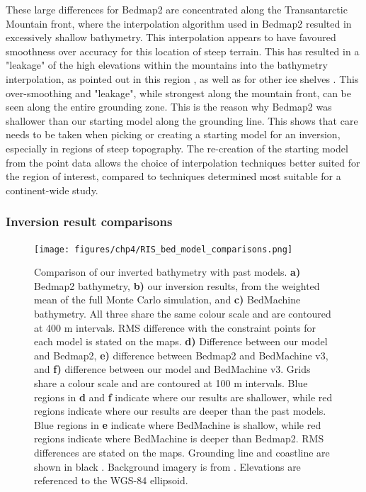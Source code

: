 These large differences for Bedmap2 are concentrated along the Transantarctic Mountain front, where the interpolation algorithm used in Bedmap2 resulted in excessively shallow bathymetry. This interpolation appears to have favoured smoothness over accuracy for this location of steep terrain. This has resulted in a "leakage" of the high elevations within the mountains into the bathymetry interpolation, as pointed out in this region \citep{lebrocqimproved2010}, as well as for other ice shelves \citep{brisbourneupdated2020}. This over-smoothing and "leakage", while strongest along the mountain front, can be seen along the entire grounding zone. This is the reason why Bedmap2 was shallower than our starting model along the grounding line. This shows that care needs to be taken when picking or creating a starting model for an inversion, especially in regions of steep topography. The re-creation of the starting model from the point data allows the choice of interpolation techniques better suited for the region of interest, compared to techniques determined most suitable for a continent-wide study.\\

\subsubsection{Inversion result comparisons}

\begin{figure}[!ht]
    \centering
    \texttt{[image: figures/chp4/RIS\_bed\_model\_comparisons.png]}
    \caption[Inverted bathymetry comparisons]{Comparison of our inverted bathymetry with past models. \textbf{a)} Bedmap2 bathymetry, \textbf{b)} our inversion results, from the weighted mean of the full Monte Carlo simulation, and \textbf{c)} BedMachine bathymetry. All three share the same colour scale and are contoured at 400 m intervals. RMS difference with the constraint points for each model is stated on the maps. \textbf{d)} Difference between our model and Bedmap2, \textbf{e)} difference between Bedmap2 and BedMachine v3, and \textbf{f)} difference between our model and BedMachine v3. Grids share a colour scale and are contoured at 100 m intervals. Blue regions in \textbf{d} and \textbf{f} indicate where our results are shallower, while red regions indicate where our results are deeper than the past models. Blue regions in \textbf{e} indicate where BedMachine is shallow, while red regions indicate where BedMachine is deeper than Bedmap2. RMS differences are stated on the maps. Grounding line and coastline are shown in black \citep{morlighemmeasures2022}. Background imagery is from \citet{scambosmodisbased2007}. Elevations are referenced to the WGS-84 ellipsoid.}
    \label{fig:chp4_RIS_bed_model_comparison}
\end{figure}

